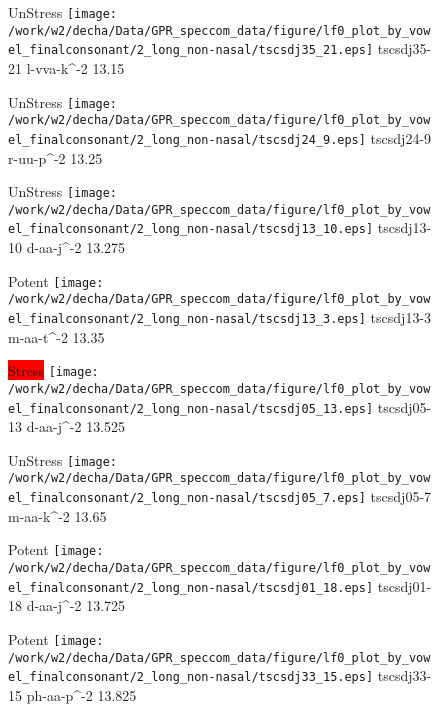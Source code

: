 \documentclass{article}
\begin{document}
\begin{figure}[t]
\begin{minipage}[b]{.24\textwidth}
UnStress
\centering
\texttt{[image: /work/w2/decha/Data/GPR\_speccom\_data/figure/lf0\_plot\_by\_vowel\_finalconsonant/2\_long\_non-nasal/tscsdj35\_21.eps]}
tscsdj35-21 l-vva-k\textasciicircum-2 13.15
\end{minipage}
\begin{minipage}[b]{.24\textwidth}
UnStress
\centering
\texttt{[image: /work/w2/decha/Data/GPR\_speccom\_data/figure/lf0\_plot\_by\_vowel\_finalconsonant/2\_long\_non-nasal/tscsdj24\_9.eps]}
tscsdj24-9 r-uu-p\textasciicircum-2 13.25
\end{minipage}
\begin{minipage}[b]{.24\textwidth}
UnStress
\centering
\texttt{[image: /work/w2/decha/Data/GPR\_speccom\_data/figure/lf0\_plot\_by\_vowel\_finalconsonant/2\_long\_non-nasal/tscsdj13\_10.eps]}
tscsdj13-10 d-aa-j\textasciicircum-2 13.275
\end{minipage}
\begin{minipage}[b]{.24\textwidth}
\colorbox{Apricot}{Potent}
\centering
\texttt{[image: /work/w2/decha/Data/GPR\_speccom\_data/figure/lf0\_plot\_by\_vowel\_finalconsonant/2\_long\_non-nasal/tscsdj13\_3.eps]}
tscsdj13-3 m-aa-t\textasciicircum-2 13.35
\end{minipage}
\end{figure}
\clearpage
\begin{figure}[t]
\begin{minipage}[b]{.24\textwidth}
\colorbox{red}{Stress}
\centering
\texttt{[image: /work/w2/decha/Data/GPR\_speccom\_data/figure/lf0\_plot\_by\_vowel\_finalconsonant/2\_long\_non-nasal/tscsdj05\_13.eps]}
tscsdj05-13 d-aa-j\textasciicircum-2 13.525
\end{minipage}
\begin{minipage}[b]{.24\textwidth}
UnStress
\centering
\texttt{[image: /work/w2/decha/Data/GPR\_speccom\_data/figure/lf0\_plot\_by\_vowel\_finalconsonant/2\_long\_non-nasal/tscsdj05\_7.eps]}
tscsdj05-7 m-aa-k\textasciicircum-2 13.65
\end{minipage}
\begin{minipage}[b]{.24\textwidth}
\colorbox{Apricot}{Potent}
\centering
\texttt{[image: /work/w2/decha/Data/GPR\_speccom\_data/figure/lf0\_plot\_by\_vowel\_finalconsonant/2\_long\_non-nasal/tscsdj01\_18.eps]}
tscsdj01-18 d-aa-j\textasciicircum-2 13.725
\end{minipage}
\begin{minipage}[b]{.24\textwidth}
\colorbox{Apricot}{Potent}
\centering
\texttt{[image: /work/w2/decha/Data/GPR\_speccom\_data/figure/lf0\_plot\_by\_vowel\_finalconsonant/2\_long\_non-nasal/tscsdj33\_15.eps]}
tscsdj33-15 ph-aa-p\textasciicircum-2 13.825
\end{minipage}
\end{figure}
\end{document}
